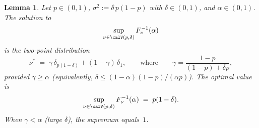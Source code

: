 \documentclass[11pt]{article}
\newtheorem{lemma}[theorem]{Lemma}
\theoremstyle{definition}
\newcommand{\1}{\mathbf{1}}
\begin{document}
\begin{lemma}\label{lem:moment_solution}
Let $p \in (0,1)$, $\sigma^2 := \delta\,p(1-p)$ with $\delta \in (0,1)$, and $\alpha \in (0,1)$. The solution to
\begin{equation}\label{eq:quantile_opt}
  \sup_{\nu \in \calV(p,\delta)} F_\nu^{-1}(\alpha)
\end{equation}
is the two-point distribution
\begin{equation}\label{eq:twopoint}
  \nu^* \;=\; \gamma\,\delta_{p(1-\delta)} + (1-\gamma)\,\delta_1,
  \qquad\text{where}\qquad
  \gamma = \frac{1-p}{(1-p) + \delta p},
\end{equation}
provided $\gamma \geq \alpha$ (equivalently, $\delta \leq (1-\alpha)(1-p)/(\alpha p)$). The optimal value is
\begin{equation}\label{eq:optimal_quantile}
  \sup_{\nu \in \calV(p,\delta)} F_\nu^{-1}(\alpha) \;=\; p(1-\delta).
\end{equation}
When $\gamma < \alpha$ (large $\delta$), the supremum equals~$1$.
\end{lemma}
\end{document}
